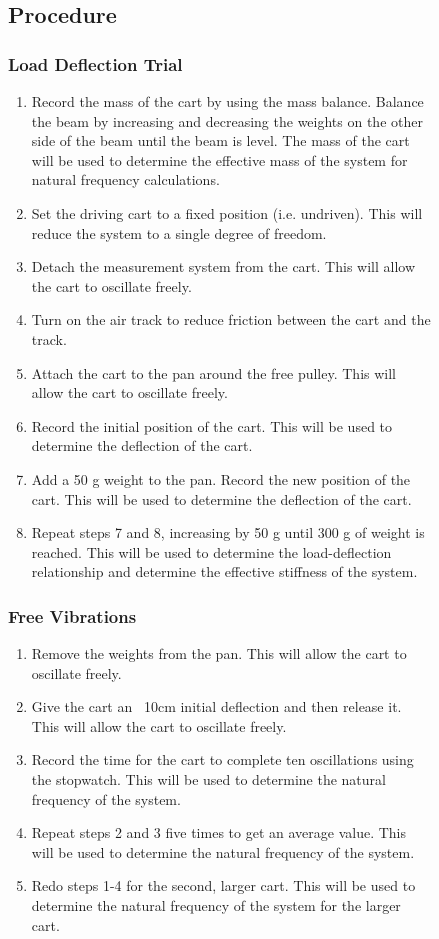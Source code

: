 \begin{figure}[h]
\subsection{Procedure}
\subsubsection{Load Deflection Trial}

\begin{enumerate}
    \item Record the mass of the cart by using the mass balance. Balance the beam by increasing and decreasing the weights on the other side of the beam until the beam is level. The mass of the cart will be used to determine the effective mass of the system for natural frequency calculations.
    \item Set the driving cart to a fixed position (i.e. undriven). This will reduce the system to a single degree of freedom.
    \item Detach the measurement system from the cart. This will allow the cart to oscillate freely.
    \item Turn on the air track to reduce friction between the cart and the track.
    \item Attach the cart to the pan around the free pulley. This will allow the cart to oscillate freely.
    \item Record the initial position of the cart. This will be used to determine the deflection of the cart.
    \item Add a 50 g weight to the pan. Record the new position of the cart. This will be used to determine the deflection of the cart.
    \item Repeat steps 7 and 8, increasing by 50 g until 300 g of weight is reached. This will be used to determine the load-deflection relationship and determine the effective stiffness of the system.
\end{enumerate}

\subsubsection{Free Vibrations}
\begin{enumerate}
    \item Remove the weights from the pan. This will allow the cart to oscillate freely.
    \item Give the cart an ~10cm initial deflection and then release it. This will allow the cart to oscillate freely.
    \item Record the time for the cart to complete ten oscillations using the stopwatch. This will be used to determine the natural frequency of the system.
    \item Repeat steps 2 and 3 five times to get an average value. This will be used to determine the natural frequency of the system.
    \item Redo steps 1-4 for the second, larger cart. This will be used to determine the natural frequency of the system for the larger cart.
\end{enumerate}


\end{figure}
